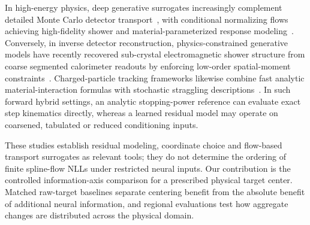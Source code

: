 In high-energy physics, deep generative surrogates increasingly complement
detailed Monte Carlo detector transport~\cite{HashemiKrause2024}, with
conditional normalizing flows achieving high-fidelity shower and material-parameterized
response modeling~\cite{KrauseShih2023,ErdmannEtAl2025}. Conversely, in inverse
detector reconstruction, physics-constrained generative models have recently
recovered sub-crystal electromagnetic shower structure from coarse segmented
calorimeter readouts by enforcing low-order spatial-moment
constraints~\cite{LiuTung2026}. Charged-particle tracking frameworks likewise
combine fast analytic material-interaction formulas with stochastic straggling
descriptions~\cite{AiEtAl2022}. In such forward hybrid settings, an analytic
stopping-power reference can evaluate exact step kinematics directly, whereas a
learned residual model may operate on coarsened, tabulated or reduced
conditioning inputs.

These studies establish residual modeling, coordinate choice and flow-based
transport surrogates as relevant tools; they do not determine the ordering of
finite spline-flow NLLs under restricted neural inputs. Our contribution is
the controlled information-axis comparison for a prescribed physical target
center. Matched raw-target baselines separate centering benefit from the
absolute benefit of additional neural information, and regional evaluations
test how aggregate changes are distributed across the physical domain.
